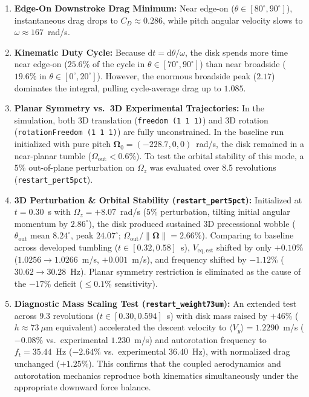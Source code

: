 \documentclass[11pt,a4paper]{article}
\begin{document}
\begin{enumerate}
\begin{itemize}
    \end{itemize}
    \item \textbf{Edge-On Downstroke Drag Minimum:} Near edge-on ($\theta \in [80^\circ, 90^\circ]$), instantaneous drag drops to $C_D \approx 0.286$, while pitch angular velocity slows to $\omega \approx 167$~rad/s.
    \item \textbf{Kinematic Duty Cycle:} Because $\mathrm{d}t = \mathrm{d}\theta / \omega$, the disk spends more time near edge-on ($25.6\%$ of the cycle in $\theta \in [70^\circ, 90^\circ]$) than near broadside ($19.6\%$ in $\theta \in [0^\circ, 20^\circ]$). However, the enormous broadside peak ($2.17$) dominates the integral, pulling cycle-average drag up to $1.085$.
    \item \textbf{Planar Symmetry vs.\ 3D Experimental Trajectories:} In the simulation, both 3D translation (\texttt{freedom (1 1 1)}) and 3D rotation (\texttt{rotationFreedom (1 1 1)}) are fully unconstrained. In the baseline run initialized with pure pitch $\boldsymbol{\Omega}_0 = (-228.7, 0, 0)$~rad/s, the disk remained in a near-planar tumble ($\Omega_{\mathrm{out}} < 0.6\%$). To test the orbital stability of this mode, a $5\%$ out-of-plane perturbation on $\Omega_z$ was evaluated over 8.5 revolutions (\texttt{restart\_pert5pct}).
    \item \textbf{3D Perturbation \& Orbital Stability (\texttt{restart\_pert5pct}):} Initialized at $t = 0.30$~s with $\Omega_z = +8.07$~rad/s ($5\%$ perturbation, tilting initial angular momentum by $2.86^\circ$), the disk produced sustained 3D precessional wobble ($\theta_{\mathrm{out}}$ mean $8.24^\circ$, peak $24.07^\circ$; $\Omega_{\mathrm{out}} / \|\boldsymbol{\Omega}\| = 2.66\%$). Comparing to baseline across developed tumbling ($t \in [0.32, 0.58]$~s), $V_{\mathrm{eq,est}}$ shifted by only $\mathbf{+0.10\%}$ ($1.0256 \to 1.0266$~m/s, $+0.001$~m/s), and frequency shifted by $-1.12\%$ ($30.62 \to 30.28$~Hz). Planar symmetry restriction is eliminated as the cause of the $-17\%$ deficit ($\le 0.1\%$ sensitivity).
    \item \textbf{Diagnostic Mass Scaling Test (\texttt{restart\_weight73um}):} An extended test across 9.3 revolutions ($t \in [0.30, 0.594]$~s) with disk mass raised by $+46\%$ ($h \approx 73\ \mu$m equivalent) accelerated the descent velocity to $\langle V_y \rangle = \mathbf{1.2290}$~m/s ($-0.08\%$ vs.\ experimental $1.230$~m/s) and autorotation frequency to $f_t = \mathbf{35.44}$~Hz ($-2.64\%$ vs.\ experimental $36.40$~Hz), with normalized drag unchanged ($+1.25\%$). This confirms that the coupled aerodynamics and autorotation mechanics reproduce both kinematics simultaneously under the appropriate downward force balance.
\end{enumerate}
\end{document}
